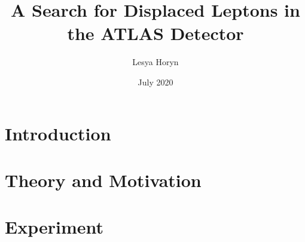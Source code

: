 \documentclass{ucetd}
\title{A Search for Displaced Leptons in the ATLAS Detector}
\author{Lesya Horyn}
\date{July 2020}
\begin{document}
\maketitle

\makecopyright
\makededication
\makeepigraph



\tableofcontents
\listoffigures
\listoftables



\acknowledgments

\abstract

\mainmatter



\part{Introduction}


\cleardoublepage

\part{Theory and Motivation}



\cleardoublepage 

\part{Experiment}







\cleardoublepage 
\end{document}
